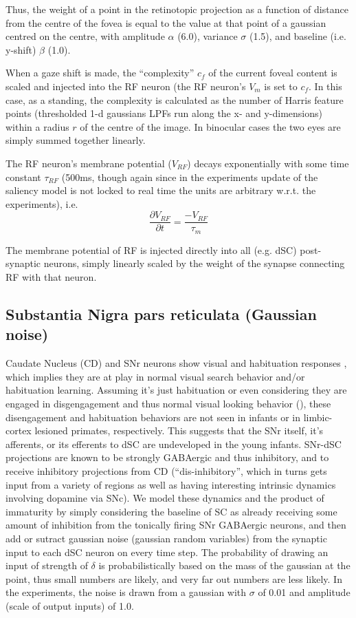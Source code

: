 \documentclass[12pt]{article}
\begin{document}
Thus, the weight of a point in the retinotopic projection as a
function of distance from the centre of the fovea is equal to the
value at that point of a gaussian centred on the centre, with
amplitude $\alpha$ (6.0), variance $\sigma$ (1.5), and baseline
(i.e. y-shift) $\beta$ (1.0).

When a gaze shift is made, the ``complexity'' $c_f$ of the current
foveal content is scaled and injected into the RF neuron (the RF
neuron's $V_m$ is set to $c_f$. In this case, as a standing, the
complexity is calculated as the number of Harris feature points
(thresholded 1-d gaussians LPFs run along the x- and y-dimensions)
within a radius $r$ of the centre of the image. In binocular cases the
two eyes are simply summed together linearly.

The RF neuron's membrane potential ($V_{RF}$) decays exponentially
with some time constant $\tau_{RF}$ (500ms, though again since in the
experiments update of the saliency model is not locked to real time
the units are arbitrary w.r.t. the experiments), i.e.
\begin{equation}
\frac{\partial V_{RF}}{\partial t} = \frac{-V_{RF}}{\tau_m}
\end{equation}

The membrane potential of RF is injected directly into all (e.g. dSC)
post-synaptic neurons, simply linearly scaled by the weight of the
synapse connecting RF with that neuron.

\subsection{Substantia Nigra pars reticulata (Gaussian noise)}

Caudate Nucleus (CD) and SNr neurons show visual and habituation
responses \cite{hikosaka_wurtz_1983_SNr1}, which implies they are at
play in normal visual search behavior and/or habituation
learning. Assuming it's just habituation or even considering they are
engaged in disgengagement and thus normal visual looking behavior
(\cite{johnson_1990}), these disengagement and habituation behaviors
are not seen in infants or in limbic-cortex lesioned primates,
respectively. This suggests that the SNr itself, it's afferents, or
its efferents to dSC are undeveloped in the young infants. SNr-dSC
projections are known to be strongly GABAergic and thus inhibitory,
and to receive inhibitory projections from CD (``dis-inhibitory'',
which in turns gets input from a variety of regions as well as having
interesting intrinsic dynamics involving dopamine via SNc). We model
these dynamics and the product of immaturity by simply considering the
baseline of SC as already receiving some amount of inhibition from the
tonically firing SNr GABAergic neurons, and then add or sutract
gaussian noise (gaussian random variables) from the synaptic input to
each dSC neuron on every time step. The probability of drawing an
input of strength of $\delta$ is probabilistically based on the mass
of the gaussian at the point, thus small numbers are likely, and very
far out numbers are less likely. In the experiments, the noise is
drawn from a gaussian with $\sigma$ of 0.01 and amplitude (scale of
output inputs) of 1.0.
\end{document}

